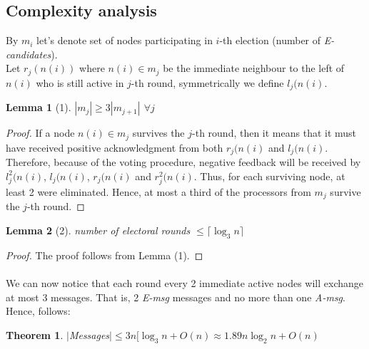 \documentclass{article}
\newtheorem*{lemma}{Lemma}
\newtheorem*{theorem}{Theorem}
\begin{document}
\subsection*{Complexity analysis}
By $m_i$ let's denote set of nodes participating in $i$-th election (number of \textit{E-candidates}).\\
Let $r_j(n(i))$ where $n(i)\in m_j$ be the immediate neighbour to the left of $n(i)$ who is still active in $j$-th round, symmetrically we define $l_j(n(i)$.
\begin{lemma}[1]
    $|m_j|\geq 3|m_{j+1}|$ $\forall j$
\end{lemma}
\begin{proof}
If a node $n(i)\in m_j$ survives the $j$-th round, then it means that it must have received positive acknowledgment from both $r_j(n(i)$ and $l_j(n(i)$.
Therefore, because of the voting procedure, negative feedback will be received by $l^{2}_{j}(n(i)$, $l_{j}(n(i)$, $r_{j}(n(i)$ and $r^{2}_{j}(n(i)$. Thus, for each surviving node, at least 2 were eliminated. 
Hence, at most a third of the processors from $m_j$ survive the $j$-th round.
\end{proof}
\begin{lemma}[2]
    number of electoral rounds $\leq \lceil\log_{3}n\rceil$
\end{lemma}
\begin{proof}
The proof follows from Lemma (1).
\end{proof}
\paragraph{}
We can now notice that each round every 2 immediate active nodes will exchange at most 3 messages. That is, 2 \textit{E-msg} messages and no more than one \textit{A-msg}.\\
Hence, follows:
\begin{theorem}
$|$Messages$|\leq 3n[\log_{3}n+O(n)\approx 1.89n \log_{2}n+O(n)$
\end{theorem}

 
\end{document}

